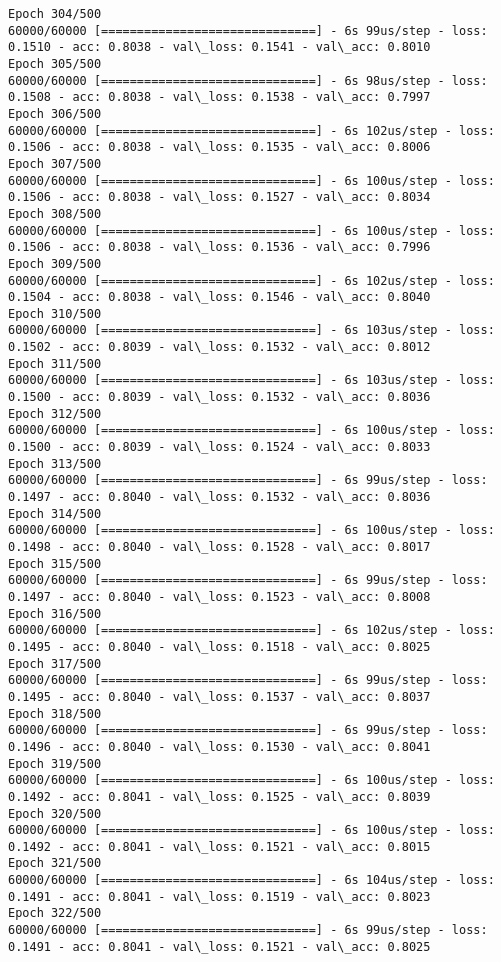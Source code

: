 \documentclass[11pt]{article}
\begin{document}
\begin{Verbatim}[commandchars=\\\{\}]
Epoch 304/500
60000/60000 [==============================] - 6s 99us/step - loss: 0.1510 - acc: 0.8038 - val\_loss: 0.1541 - val\_acc: 0.8010
Epoch 305/500
60000/60000 [==============================] - 6s 98us/step - loss: 0.1508 - acc: 0.8038 - val\_loss: 0.1538 - val\_acc: 0.7997
Epoch 306/500
60000/60000 [==============================] - 6s 102us/step - loss: 0.1506 - acc: 0.8038 - val\_loss: 0.1535 - val\_acc: 0.8006
Epoch 307/500
60000/60000 [==============================] - 6s 100us/step - loss: 0.1506 - acc: 0.8038 - val\_loss: 0.1527 - val\_acc: 0.8034
Epoch 308/500
60000/60000 [==============================] - 6s 100us/step - loss: 0.1506 - acc: 0.8038 - val\_loss: 0.1536 - val\_acc: 0.7996
Epoch 309/500
60000/60000 [==============================] - 6s 102us/step - loss: 0.1504 - acc: 0.8038 - val\_loss: 0.1546 - val\_acc: 0.8040
Epoch 310/500
60000/60000 [==============================] - 6s 103us/step - loss: 0.1502 - acc: 0.8039 - val\_loss: 0.1532 - val\_acc: 0.8012
Epoch 311/500
60000/60000 [==============================] - 6s 103us/step - loss: 0.1500 - acc: 0.8039 - val\_loss: 0.1532 - val\_acc: 0.8036
Epoch 312/500
60000/60000 [==============================] - 6s 100us/step - loss: 0.1500 - acc: 0.8039 - val\_loss: 0.1524 - val\_acc: 0.8033
Epoch 313/500
60000/60000 [==============================] - 6s 99us/step - loss: 0.1497 - acc: 0.8040 - val\_loss: 0.1532 - val\_acc: 0.8036
Epoch 314/500
60000/60000 [==============================] - 6s 100us/step - loss: 0.1498 - acc: 0.8040 - val\_loss: 0.1528 - val\_acc: 0.8017
Epoch 315/500
60000/60000 [==============================] - 6s 99us/step - loss: 0.1497 - acc: 0.8040 - val\_loss: 0.1523 - val\_acc: 0.8008
Epoch 316/500
60000/60000 [==============================] - 6s 102us/step - loss: 0.1495 - acc: 0.8040 - val\_loss: 0.1518 - val\_acc: 0.8025
Epoch 317/500
60000/60000 [==============================] - 6s 99us/step - loss: 0.1495 - acc: 0.8040 - val\_loss: 0.1537 - val\_acc: 0.8037
Epoch 318/500
60000/60000 [==============================] - 6s 99us/step - loss: 0.1496 - acc: 0.8040 - val\_loss: 0.1530 - val\_acc: 0.8041
Epoch 319/500
60000/60000 [==============================] - 6s 100us/step - loss: 0.1492 - acc: 0.8041 - val\_loss: 0.1525 - val\_acc: 0.8039
Epoch 320/500
60000/60000 [==============================] - 6s 100us/step - loss: 0.1492 - acc: 0.8041 - val\_loss: 0.1521 - val\_acc: 0.8015
Epoch 321/500
60000/60000 [==============================] - 6s 104us/step - loss: 0.1491 - acc: 0.8041 - val\_loss: 0.1519 - val\_acc: 0.8023
Epoch 322/500
60000/60000 [==============================] - 6s 99us/step - loss: 0.1491 - acc: 0.8041 - val\_loss: 0.1521 - val\_acc: 0.8025

\end{Verbatim}
\end{document}

